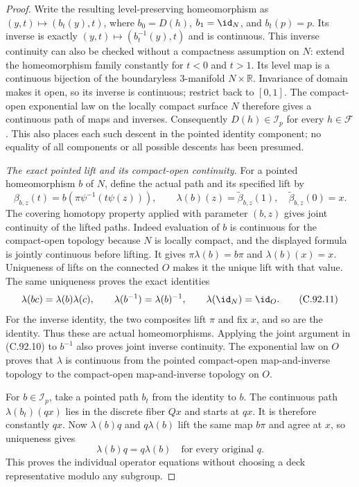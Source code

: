 \begin{proof}
Write the resulting level-preserving homeomorphism as
$(y,t)\mapsto(b_t(y),t)$, where $b_0=D(h)$, $b_1=\id_N$,
and $b_t(p)=p$. Its inverse is exactly
$(y,t)\mapsto(b_t^{-1}(y),t)$ and is continuous.
This inverse continuity can also be checked without a
compactness assumption on $N$: extend the homeomorphism
family constantly for $t<0$ and $t>1$. Its level map is
a continuous bijection of the boundaryless $3$-manifold
$N\times\mathbb R$. Invariance of domain makes it open,
so its inverse is continuous; restrict back to $[0,1]$.
The compact-open exponential law on the locally compact
surface $N$ therefore gives a continuous path of maps and
inverses. Consequently $D(h)\in\mathscr I_p$ for every
$h\in\mathscr F$. This also places each such descent in the
pointed identity component; no equality of all components
or all possible descents has been presumed.

\emph{The exact pointed lift and its compact-open continuity.}
For a pointed homeomorphism $b$ of $N$, define the actual path
and its specified lift by
\[
 \beta_{b,z}(t)=b\!\left(\pi\psi^{-1}(t\psi(z))\right),
 \qquad
 \lambda(b)(z)=\widetilde\beta_{b,z}(1),\quad
 \widetilde\beta_{b,z}(0)=x.
                                                               \tag{C.92.10}
\]
The covering homotopy property applied with parameter $(b,z)$
gives joint continuity of the lifted paths. Indeed evaluation
of $b$ is continuous for the compact-open topology because
$N$ is locally compact, and the displayed formula is jointly
continuous before lifting. It gives
$\pi\lambda(b)=b\pi$ and $\lambda(b)(x)=x$.
Uniqueness of lifts on the connected $O$ makes it the unique
lift with that value. The same uniqueness proves the exact
identities
\[
 \lambda(bc)=\lambda(b)\lambda(c),\qquad
 \lambda(b^{-1})=\lambda(b)^{-1},\qquad
 \lambda(\id_N)=\id_O.
                                                               \tag{C.92.11}
\]
For the inverse identity, the two composites lift $\pi$
and fix $x$, and so are the identity. Thus these are actual
homeomorphisms. Applying the joint argument in (C.92.10) to
$b^{-1}$ also proves joint inverse continuity.
The exponential law on $O$ proves that $\lambda$ is continuous
from the pointed compact-open map-and-inverse topology to
the compact-open map-and-inverse topology on $O$.

For $b\in\mathscr I_p$, take a pointed path $b_t$ from the
identity to $b$. The continuous path $\lambda(b_t)(qx)$
lies in the discrete fiber $Qx$ and starts at $qx$.
It is therefore constantly $qx$. Now
$\lambda(b)q$ and $q\lambda(b)$ lift the same map $b\pi$
and agree at $x$, so uniqueness gives
\[
                  \lambda(b)q=q\lambda(b)
                         \quad\text{for every original }q.
                                                               \tag{C.92.12}
\]
This proves the individual operator equations without choosing
a deck representative modulo any subgroup.


\end{proof}
